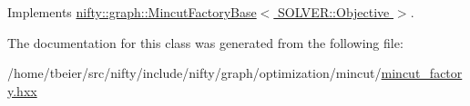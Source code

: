 Implements \hyperlink{classnifty_1_1graph_1_1MincutFactoryBase_a55ea4e7c0dea7ea81f27b51a1b87c3f7}{nifty\+::graph\+::\+Mincut\+Factory\+Base$<$ S\+O\+L\+V\+E\+R\+::\+Objective $>$}.



The documentation for this class was generated from the following file\+:\begin{DoxyCompactItemize}
\item 
/home/tbeier/src/nifty/include/nifty/graph/optimization/mincut/\hyperlink{mincut__factory_8hxx}{mincut\+\_\+factory.\+hxx}\end{DoxyCompactItemize}
